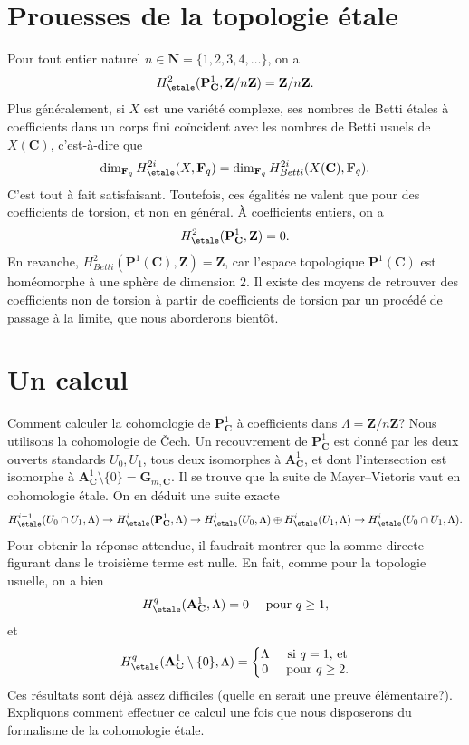 \section{Prouesses de la topologie \'etale}
\label{section-feats}

\noindent
Pour tout entier naturel $n \in \mathbf{N} = \{1, 2, 3, 4, \ldots\}$, on a
$$
H_\etale^2 (\mathbf{P}^1_\mathbf{C}, \mathbf{Z}/n\mathbf{Z}) =
\mathbf{Z}/n\mathbf{Z}.
$$
Plus g\'en\'eralement, si $X$ est une vari\'et\'e complexe, ses nombres de Betti
\'etales \`a coefficients dans un corps fini co\"incident avec les nombres de
Betti usuels de $X(\mathbf{C})$, c'est-\`a-dire que
$$
\dim_{\mathbf{F}_q} H_\etale^{2i} (X, \mathbf{F}_q) =
\dim_{\mathbf{F}_q} H_{Betti}^{2i} (X(\mathbf{C}), \mathbf{F}_q).
$$
C'est tout \`a fait satisfaisant. Toutefois, ces \'egalit\'es ne valent que pour des
coefficients de torsion, et non en g\'en\'eral. \`A coefficients entiers, on a
$$
H_\etale^2 (\mathbf{P}^1_\mathbf{C}, \mathbf{Z}) = 0.
$$
En revanche,
$H_{Betti}^2(\mathbf{P}^1(\mathbf{C}), \mathbf{Z}) = \mathbf{Z}$, car l'espace
topologique $\mathbf{P}^1(\mathbf{C})$ est hom\'eomorphe \`a une sph\`ere de
dimension $2$. Il existe des moyens de retrouver des coefficients non de
torsion \`a partir de coefficients de torsion par un proc\'ed\'e de passage \`a la
limite, que nous aborderons bient\^ot.




\section{Un calcul}
\label{section-computation}

\noindent
Comment calculer la cohomologie de $\mathbf{P}^1_\mathbf{C}$ \`a coefficients
dans $\Lambda = \mathbf{Z}/n\mathbf{Z}$?
Nous utilisons la cohomologie de {\v C}ech. Un recouvrement de
$\mathbf{P}^1_\mathbf{C}$ est donn\'e par les deux ouverts standards $U_0, U_1$,
tous deux isomorphes \`a $\mathbf{A}^1_\mathbf{C}$, et dont l'intersection est
isomorphe \`a
$\mathbf{A}^1_\mathbf{C} \setminus \{0\} = \mathbf{G}_{m, \mathbf{C}}$.
Il se trouve que la suite de Mayer--Vietoris vaut en cohomologie \'etale. On en
d\'eduit une suite exacte
$$
H_\etale^{i-1}(U_0\cap U_1, \Lambda) \to
H_\etale^i(\mathbf{P}^1_\mathbf{C}, \Lambda) \to
H_\etale^i(U_0, \Lambda) \oplus
H_\etale^i(U_1, \Lambda) \to H_\etale^i(U_0\cap U_1,
\Lambda).
$$
Pour obtenir la r\'eponse attendue, il faudrait montrer que la somme directe
figurant dans le troisi\`eme terme est nulle. En fait, comme pour la topologie
usuelle, on a bien
$$
H_\etale^q (\mathbf{A}^1_\mathbf{C}, \Lambda) = 0
\quad \text{ pour } q \geq 1,
$$
et
$$
H_\etale^q (\mathbf{A}^1_\mathbf{C} \setminus \{0\}, \Lambda) = \left\{
\begin{matrix}
\Lambda & \text{ si }q = 1\text{, et} \\
0 & \text{ pour }q \geq 2.
\end{matrix}
\right.
$$
Ces r\'esultats sont d\'ej\`a assez difficiles (quelle en serait une preuve
\'el\'ementaire?). Expliquons comment effectuer ce calcul une fois que nous
disposerons du formalisme de la cohomologie \'etale.

